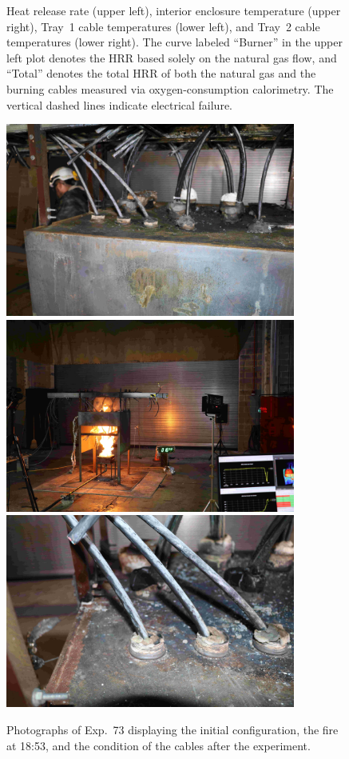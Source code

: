 \begin{figure}[H]
\caption[HRR and temperatures of Exp.~73]{Heat release rate (upper left), interior enclosure temperature (upper right), Tray~1 cable temperatures (lower left), and Tray~2 cable temperatures (lower right). The curve labeled ``Burner'' in the upper left plot denotes the HRR based solely on the natural gas flow, and ``Total'' denotes the total HRR of both the natural gas and the burning cables measured via oxygen-consumption calorimetry. The vertical dashed lines indicate electrical failure.}
\label{fig:Test_73}
\end{figure}

\begin{figure}[p]
\centering
\includegraphics[height=2.50in]{../FIGURES/Test_73_Photo_1} \\ \vspace{0.1in}
\includegraphics[height=2.50in]{../FIGURES/Test_73_Photo_2} \\ \vspace{0.1in}
\includegraphics[height=2.50in]{../FIGURES/Test_73_Photo_3}
\caption[Photographs of Exp.~73]{Photographs of Exp.~73 displaying the initial configuration, the fire at 18:53, and the condition of the cables after the experiment.}
\label{fig:Test_73_photos}
\end{figure}


